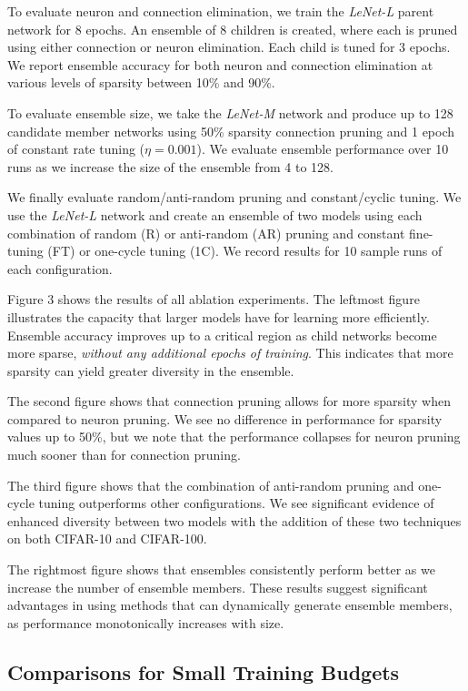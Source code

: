 \documentclass[letterpaper]{article} %
\begin{document}
To evaluate neuron and connection elimination, we train the {\it LeNet-L} parent network for 8 epochs. An ensemble of 8 children is created, where each is pruned using either connection or neuron elimination. Each child is tuned for 3 epochs. We report ensemble accuracy for both neuron and connection elimination at various levels of sparsity between 10\% and 90\%.

To evaluate ensemble size, we take the {\it LeNet-M} network and produce up to 128 candidate member networks using 50\% sparsity connection pruning and 1 epoch of constant rate tuning ($\eta=0.001$). We evaluate ensemble performance over 10 runs as we increase the size of the ensemble from 4 to 128.

We finally evaluate random/anti-random pruning and constant/cyclic tuning. We use the {\it LeNet-L} network and create an ensemble of two models using each combination of random (R) or anti-random (AR) pruning and constant fine-tuning (FT) or one-cycle tuning (1C). We record results for 10 sample runs of each configuration.

Figure 3 shows the results of all ablation experiments. The leftmost figure illustrates the capacity that larger models have for learning more efficiently. Ensemble accuracy improves up to a critical region as child networks become more sparse, {\em without any additional epochs of training}. This indicates that more sparsity can yield greater diversity in the ensemble.

The second figure shows that connection pruning allows for more sparsity when compared to neuron pruning. We see no difference in performance for sparsity values up to 50\%, but we note that the performance collapses for neuron pruning much sooner than for connection pruning.

The third figure shows that the combination of anti-random pruning and one-cycle tuning outperforms other configurations. We see significant evidence of enhanced diversity between two models with the addition of these two techniques on both CIFAR-10 and CIFAR-100.

The rightmost figure shows that ensembles consistently perform better as we increase the number of ensemble members. These results suggest significant advantages in using methods that can dynamically generate ensemble members, as performance monotonically increases with size.

\subsection{Comparisons for Small Training Budgets}
\end{document}
